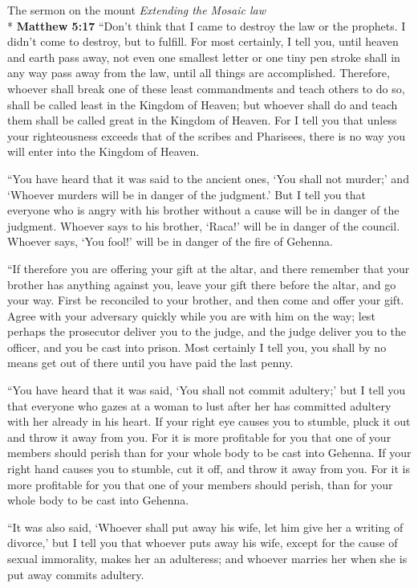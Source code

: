 \documentclass[10pt,twoside]{article} %
\newcommand{\quotesize}{\normalsize{}}
\newenvironment{quotetext}{\begingroup\quotesize}{\endgroup}
\newcommand{\intex}[1]{\index[texts]{#1}}
\newcommand{\bible}[2]{\begin{quotetext}\textbf{#1}\intex{#1} #2\end{quotetext}}
\newcommand{\matthew}[2]{\bible{Matthew #1}{#2}}
\newcommand{\subhead}[1]{\emph{#1}\\*}
\begin{document}
\begin{section}{The sermon on the mount}
\subhead{Extending the Mosaic law}
\matthew{5:17}{
``Don't think that I came to destroy the law or the prophets. I didn't come to destroy, but to fulfill.    For most certainly, I tell you, until heaven and earth pass away, not even one smallest letter or one tiny pen stroke shall in any way pass away from the law, until all things are accomplished.    Therefore, whoever shall break one of these least commandments and teach others to do so, shall be called least in the Kingdom of Heaven; but whoever shall do and teach them shall be called great in the Kingdom of Heaven.    For I tell you that unless your righteousness exceeds that of the scribes and Pharisees, there is no way you will enter into the Kingdom of Heaven.

   ``You have heard that it was said to the ancient ones, `You shall not murder;' and `Whoever murders will be in danger of the judgment.'    But I tell you that everyone who is angry with his brother without a cause  will be in danger of the judgment. Whoever says to his brother, `Raca!' will be in danger of the council. Whoever says, `You fool!' will be in danger of the fire of Gehenna.

   ``If therefore you are offering your gift at the altar, and there remember that your brother has anything against you,    leave your gift there before the altar, and go your way. First be reconciled to your brother, and then come and offer your gift.    Agree with your adversary quickly while you are with him on the way; lest perhaps the prosecutor deliver you to the judge, and the judge deliver you to the officer, and you be cast into prison.    Most certainly I tell you, you shall by no means get out of there until you have paid the last penny.

   ``You have heard that it was said,  `You shall not commit adultery;'    but I tell you that everyone who gazes at a woman to lust after her has committed adultery with her already in his heart.    If your right eye causes you to stumble, pluck it out and throw it away from you. For it is more profitable for you that one of your members should perish than for your whole body to be cast into Gehenna.    If your right hand causes you to stumble, cut it off, and throw it away from you. For it is more profitable for you that one of your members should perish, than for your whole body to be cast into Gehenna.

   ``It was also said, `Whoever shall put away his wife, let him give her a writing of divorce,'    but I tell you that whoever puts away his wife, except for the cause of sexual immorality, makes her an adulteress; and whoever marries her when she is put away commits adultery.

}
\end{section}
\end{document}
